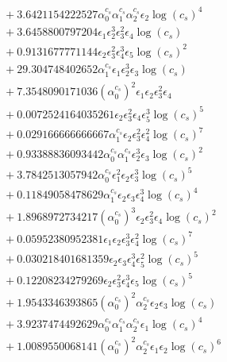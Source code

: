\documentclass[10pt]{article}
\begin{document}
\begin{align*}
&{}  + 3.6421154222527 \alpha_{0}^{c_s} \alpha_{1}^{c_s} \alpha_{2}^{c_s} \epsilon_{2} \log{\left(c_{s} \right)}^{4} \\
&{}  + 3.6458800797204 \epsilon_{1} \epsilon_{2}^{3} \epsilon_{3}^{2} \epsilon_{4} \log{\left(c_{s} \right)} \\
&{}  + 0.9131677771144 \epsilon_{2} \epsilon_{3}^{2} \epsilon_{4}^{3} \epsilon_{5} \log{\left(c_{s} \right)}^{2} \\
&{}  + 29.304748402652 \alpha_{1}^{c_s} \epsilon_{1} \epsilon_{2}^{3} \epsilon_{3} \log{\left(c_{s} \right)} \\
&{}  + 7.3548090171036 \left(\alpha_{0}^{c_s}\right)^{2} \epsilon_{1} \epsilon_{2} \epsilon_{3}^{2} \epsilon_{4} \\
&{}  + 0.0072524164035261 \epsilon_{2} \epsilon_{3}^{2} \epsilon_{4} \epsilon_{5}^{3} \log{\left(c_{s} \right)}^{5} \\
&{}  + 0.029166666666667 \alpha_{1}^{c_s} \epsilon_{2} \epsilon_{3}^{2} \epsilon_{4}^{2} \log{\left(c_{s} \right)}^{7} \\
&{}  + 0.93388836093442 \alpha_{0}^{c_s} \alpha_{1}^{c_s} \epsilon_{2}^{3} \epsilon_{3} \log{\left(c_{s} \right)}^{2} \\
&{}  + 3.7842513057942 \alpha_{0}^{c_s} \epsilon_{1}^{2} \epsilon_{2} \epsilon_{3}^{3} \log{\left(c_{s} \right)}^{5} \\
&{}  + 0.11849058478629 \alpha_{1}^{c_s} \epsilon_{2} \epsilon_{3} \epsilon_{4}^{3} \log{\left(c_{s} \right)}^{4} \\
&{}  + 1.8968972734217 \left(\alpha_{0}^{c_s}\right)^{3} \epsilon_{2} \epsilon_{3}^{2} \epsilon_{4} \log{\left(c_{s} \right)}^{2} \\
&{}  + 0.05952380952381 \epsilon_{1} \epsilon_{2} \epsilon_{3}^{3} \epsilon_{4}^{2} \log{\left(c_{s} \right)}^{7} \\
&{}  + 0.030218401681359 \epsilon_{2} \epsilon_{3} \epsilon_{4}^{3} \epsilon_{5}^{2} \log{\left(c_{s} \right)}^{5} \\
&{}  + 0.12208234279269 \epsilon_{2} \epsilon_{3}^{2} \epsilon_{4}^{3} \epsilon_{5} \log{\left(c_{s} \right)}^{5} \\
&{}  + 1.9543346393865 \left(\alpha_{0}^{c_s}\right)^{2} \alpha_{2}^{c_s} \epsilon_{2} \epsilon_{3} \log{\left(c_{s} \right)} \\
&{}  + 3.9237474492629 \alpha_{0}^{c_s} \alpha_{1}^{c_s} \alpha_{2}^{c_s} \epsilon_{1} \log{\left(c_{s} \right)}^{4} \\
&{}  + 1.0089550068141 \left(\alpha_{0}^{c_s}\right)^{2} \alpha_{2}^{c_s} \epsilon_{1} \epsilon_{2} \log{\left(c_{s} \right)}^{6} \\

\end{align*}
\end{document}
